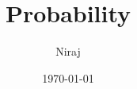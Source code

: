 

\author{Niraj}
\date{\today}

\title{Probability}



\maketitle

\newpage

\tableofcontents

\newpage



	
